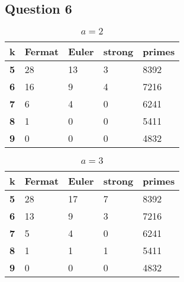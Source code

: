 \documentclass[10pt,a4paper]{report}
\begin{document}
\subsection*{Question 6}

\begin{table}[h]
\centering
\begin{tabular}{|l|l|l|l|l|}
\hline
\textbf{k} & \textbf{Fermat} & \textbf{Euler} & \textbf{strong} & \textbf{primes} \\ \hline
\textbf{5} & 28              & 13             & 3               & 8392            \\ \hline
\textbf{6} & 16              & 9              & 4               & 7216            \\ \hline
\textbf{7} & 6               & 4              & 0               & 6241            \\ \hline
\textbf{8} & 1               & 0              & 0               & 5411            \\ \hline
\textbf{9} & 0               & 0              & 0               & 4832            \\ \hline
\end{tabular}
\caption{$a=2$}
\end{table}

\begin{table}[h]
\centering
\begin{tabular}{|l|l|l|l|l|}
\hline
\textbf{k} & \textbf{Fermat} & \textbf{Euler} & \textbf{strong} & \textbf{primes} \\ \hline
\textbf{5} & 28              & 17             & 7               & 8392            \\ \hline
\textbf{6} & 13              & 9              & 3               & 7216            \\ \hline
\textbf{7} & 5               & 4              & 0               & 6241            \\ \hline
\textbf{8} & 1               & 1              & 1               & 5411            \\ \hline
\textbf{9} & 0               & 0              & 0               & 4832            \\ \hline
\end{tabular}
\caption{$a=3$}
\end{table}
\end{document}

